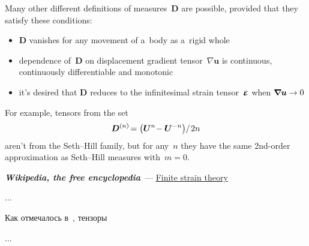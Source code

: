 Many other different definitions of measures~$\bm{D}$ are possible, provided that they satisfy these conditions:

\begin{itemize}
\item $\bm{D}$ vanishes for any movement of a~body as a~rigid whole
\item dependence of~$\bm{D}$ on displacement gradient tensor~${\nabla \bm{u}}$ is continuous, continuously differentiable and monotonic
\item it’s desired that $\bm{D}$ reduces to the infinitesimal strain tensor~${\mathboldepsilon}$ when ${\bm{\nabla}\hspace{-0.2ex} \bm{u} \to 0}$
\end{itemize}

\noindent For example, tensors from the set
\[ \displaystyle \bm{D}^{(n)} \hspace{-0.32ex} = \left( {\bm{U}}^{n} \hspace{-0.4ex} - {\bm{U}}^{-n} \right) \hspace{-0.4ex} / \hspace{.25ex} 2n \]
aren’t from the Seth\hbox{--}Hill family, but for any~$n$ they have the same 2nd\hbox{-}order approximation as Seth\hbox{--}Hill measures with~${m=0}$.

\vspace{.4em} \noindent \hfill \textbf{\emph{Wikipedia, the free encyclopedia}}~--- \href{https://en.wikipedia.org/wiki/Finite_strain_theory}{Finite strain theory}

\vspace{1cm}

\begin{otherlanguage}{russian}

...

Как отмечалось в~, тензоры


...



\end{otherlanguage}



\label{para:velocityfield}

